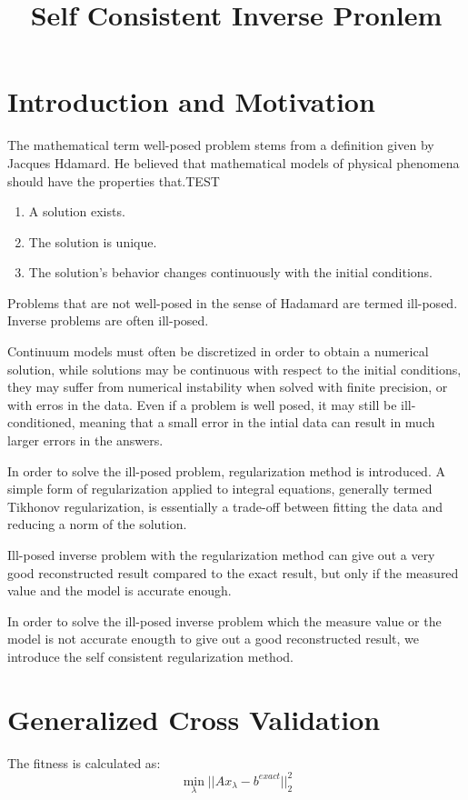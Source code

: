 \documentclass{article}
\begin{document}
\title{Self Consistent Inverse Pronlem}
\maketitle

\section{Introduction and Motivation}
The mathematical term well-posed problem stems from a definition given by
Jacques Hdamard. He believed that mathematical models of physical phenomena
should have the properties that.TEST
\begin{enumerate} 
  \item A solution exists.
  \item The solution is unique.
  \item The solution's behavior changes continuously with the initial
  conditions.
\end{enumerate}
Problems that are not well-posed in the sense
of Hadamard are termed ill-posed. Inverse problems are often ill-posed.

Continuum models must often be discretized in order to obtain a numerical
solution, while solutions may be continuous with respect to the initial
conditions, they may suffer from numerical instability when solved with finite
precision, or with erros in the data. Even if a problem is well posed, it may
still be ill-conditioned, meaning that a small error in the intial data can
result in much larger errors in the answers.

In order to solve the ill-posed problem, regularization method is introduced. A
simple form of regularization applied to integral equations, generally termed
Tikhonov regularization, is essentially a trade-off between fitting the data and
reducing a norm of the solution. 

Ill-posed inverse problem with the regularization method can give out a very
good reconstructed result compared to the exact result, but only if the measured
value and the model is accurate enough.

In order to solve the ill-posed inverse problem which the measure value or the 
model is not accurate enougth to give out a good reconstructed result, we
introduce the self consistent regularization method.


\section{Generalized Cross Validation}
The fitness is calculated as:
\begin{equation}
	\mathop {\min }\limits_\lambda  ||A{x_\lambda } - {b^{exact}}||_2^2
\end{equation}
\end{document}
